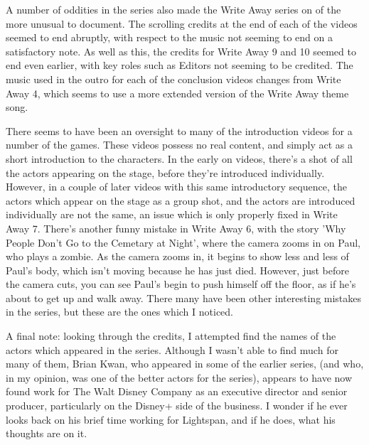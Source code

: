 A number of oddities in the series also made the Write Away series on of the more unusual to document. The scrolling credits at the end of each of the videos seemed to end abruptly, with respect to the music not seeming to end on a satisfactory note. As well as this, the credits for Write Away 9 and 10 seemed to end even earlier, with key roles such as Editors not seeming to be credited. The music used in the outro for each of the conclusion videos changes from Write Away 4, which seems to use a more extended version of the Write Away theme song.

There seems to have been an oversight to many of the introduction videos for a number of the games. These videos possess no real content, and simply act as a short introduction to the characters. In the early on videos, there's a shot of all the actors appearing on the stage, before they're introduced individually. However, in a couple of later videos with this same introductory sequence, the actors which appear on the stage as a group shot, and the actors are introduced individually are not the same, an issue which is only properly fixed in Write Away 7. There's another funny mistake in Write Away 6, with the story 'Why People Don't Go to the Cemetary at Night', where the camera zooms in on Paul, who plays a zombie. As the camera zooms in, it begins to show less and less of Paul's body, which isn't moving because he has just died. However, just before the camera cuts, you can see Paul's begin to push himself off the floor, as if he's about to get up and walk away. There many have been other interesting mistakes in the series, but these are the ones which I noticed.

A final note: looking through the credits, I attempted find the names of the actors which appeared in the series. Although I wasn't able to find much for many of them, Brian Kwan, who appeared in some of the earlier series, (and who, in my opinion, was one of the better actors for the series), appears to have now found work for The Walt Disney Company as an executive director and senior producer, particularly on the Disney+ side of the business. I wonder if he ever looks back on his brief time working for Lightspan, and if he does, what his thoughts are on it.